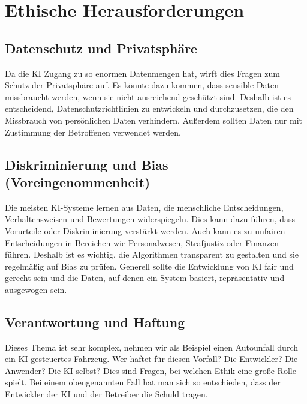 \chapter{Ethische Herausforderungen}
\label{chap:ethik}

\section{Datenschutz und Privatsphäre}

Da die KI Zugang zu so enormen Datenmengen hat, wirft dies Fragen zum Schutz der Privatsphäre auf. Es könnte dazu kommen, dass sensible Daten missbraucht werden, wenn sie nicht ausreichend geschützt sind. Deshalb ist es entscheidend, Datenschutzrichtlinien zu entwickeln und durchzusetzen, die den Missbrauch von persönlichen Daten verhindern. Außerdem sollten Daten nur mit Zustimmung der Betroffenen verwendet werden.

\section{Diskriminierung und Bias (Voreingenommenheit)}

Die meisten KI-Systeme lernen aus Daten, die menschliche Entscheidungen, Verhaltensweisen und Bewertungen widerspiegeln. Dies kann dazu führen, dass Vorurteile oder Diskriminierung verstärkt werden. Auch kann es zu unfairen Entscheidungen in Bereichen wie Personalwesen, Strafjustiz oder Finanzen führen. Deshalb ist es wichtig, die Algorithmen transparent zu gestalten und sie regelmäßig auf Bias zu prüfen. Generell sollte die Entwicklung von KI fair und gerecht sein und die Daten, auf denen ein System basiert, repräsentativ und ausgewogen sein.

\section{Verantwortung und Haftung}

Dieses Thema ist sehr komplex, nehmen wir als Beispiel einen Autounfall durch ein KI-gesteuertes Fahrzeug. Wer haftet für diesen Vorfall? Die Entwickler? Die Anwender? Die KI selbst? Dies sind Fragen, bei welchen Ethik eine große Rolle spielt. Bei einem obengenannten Fall hat man sich so entschieden, dass der Entwickler der KI und der Betreiber die Schuld tragen. 
